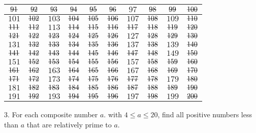 \begin{mdframed}[style=darkAnswer,frametitle={Joe Starr}]
\begin{center}
\begin{tabular}{| c | c | c | c | c | c | c | c | c | c |}
        \hline
        $\msout{91}$ & $\msout{92}$ & $\msout{93}$ & $\msout{94}$ & $\msout{95}$ & $\msout{96}$ & $97$ & $\msout{98}$ & $\msout{99}$ & $\msout{100}$ \\
        \hline
        $101$ & $\msout{102}$ & $103$ & $\msout{104}$ & $\msout{105}$ & $\msout{106}$ & $107$ & $\msout{108}$ & $109$ & $\msout{110}$ \\
        \hline
        $\msout{111}$ & $\msout{112}$ & $113$ & $\msout{114}$ & $\msout{115}$ & $\msout{116}$ & $\msout{117}$ & $\msout{118}$ & $\msout{119}$ & $\msout{120}$ \\
        \hline
        $\msout{121}$ & $\msout{122}$ & $\msout{123}$ & $\msout{124}$ & $\msout{125}$ & $\msout{126}$ & $127$ & $\msout{128}$ & $\msout{129}$ & $\msout{130}$ \\
        \hline
        $131$ & $\msout{132}$ & $\msout{133}$ & $\msout{134}$ & $\msout{135}$ & $\msout{136}$ & $137$ & $\msout{138}$ & $139$ & $\msout{140}$ \\
        \hline
        $\msout{141}$ & $\msout{142}$ & $\msout{143}$ & $\msout{144}$ & $\msout{145}$ & $\msout{146}$ & $\msout{147}$ & $\msout{148}$ & $149$ & $\msout{150}$ \\
        \hline
        $151$ & $\msout{152}$ & $\msout{153}$ & $\msout{154}$ & $\msout{155}$ & $\msout{156}$ & $157$ & $\msout{158}$ & $\msout{159}$ & $\msout{160}$ \\
        \hline
        $\msout{161}$ & $\msout{162}$ & $163$ & $\msout{164}$ & $\msout{165}$ & $\msout{166}$ & $167$ & $\msout{168}$ & $\msout{169}$ & $\msout{170}$ \\
        \hline
        $\msout{171}$ & $\msout{172}$ & $173$ & $\msout{174}$ & $\msout{175}$ & $\msout{176}$ & $\msout{177}$ & $\msout{178}$ & $179$ & $\msout{180}$ \\
        \hline
        $181$ & $\msout{182}$ & $\msout{183}$ & $\msout{184}$ & $\msout{185}$ & $\msout{186}$ & $\msout{187}$ & $\msout{188}$ & $\msout{189}$ & $\msout{190}$ \\
        \hline
        $191$ & $\msout{192}$ & $193$ & $\msout{194}$ & $\msout{195}$ & $\msout{196}$ & $197$ & $\msout{198}$ & $199$ & $\msout{200}$\\
        \hline
        \end{tabular}
        \end{center}    
\end{mdframed}
\newpage
\begin{mdframed}[style=darkQuesion]
3. For each composite number $a$. with $4\leq a\leq 20$, find all positive 
numbers less than $a$ that are relatively prime to $a$.
\end{mdframed}

